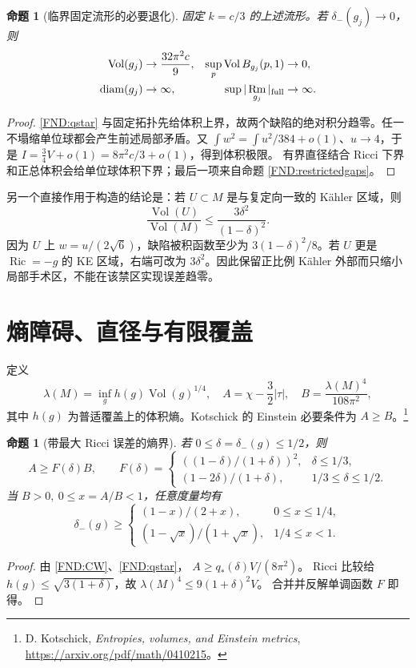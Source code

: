 \documentclass[UTF8,fontset=fandol,zihao=-4,oneside,openany]{ctexbook}
\theoremstyle{cjkplain}
\newtheorem{proposition}[theorem]{命题}
\numberwithin{equation}{chapter}
\DeclareMathOperator{\Ric}{Ric}
\DeclareMathOperator{\Rm}{Rm}
\DeclareMathOperator{\Vol}{Vol}
\begin{document}
\begin{proposition}[临界固定流形的必要退化]\label{FND:criticalcollapse}
固定 \(k=c/3\) 的上述流形。若 \(\delta_-(g_j)\to0\)，则
\[
\begin{aligned}
\Vol(g_j)&\to\frac{32\pi^2c}{9},&
\sup_p\Vol B_{g_j}(p,1)&\to0,\\
\operatorname{diam}(g_j)&\to\infty,&
\sup|\Rm_{g_j}|_{\rm full}&\to\infty .
\end{aligned}
\]
\end{proposition}
\begin{proof}
\eqref{FND:qstar} 与固定拓扑先给体积上界，故两个缺陷的绝对积分趋零。任一不塌缩单位球都会产生前述局部矛盾。又
\(\int w^2=\int u^2/384+o(1)\)、\(u\to4\)，于是
\(I=\frac34V+o(1)=8\pi^2c/3+o(1)\)，得到体积极限。
有界直径结合 Ricci 下界和正总体积会给单位球体积下界；最后一项来自命题 \ref{FND:restrictedgaps}。
\end{proof}

另一个直接作用于构造的结论是：若 \(U\subset M\) 是与复定向一致的 Kähler 区域，则
\begin{equation}\label{FND:kahlerfraction}
\frac{\Vol(U)}{\Vol(M)}
\le\frac{3\delta^2}{(1-\delta)^2}.
\end{equation}
因为 \(U\) 上 \(w=u/(2\sqrt6)\)，缺陷被积函数至少为
\(3(1-\delta)^2/8\)。若 \(U\) 更是 \(\Ric=-g\) 的 KE 区域，右端可改为 \(3\delta^2\)。因此保留正比例 Kähler 外部而只缩小局部手术区，不能在该禁区实现误差趋零。

\section{熵障碍、直径与有限覆盖}
定义
\[
\lambda(M)=\inf_g h(g)\Vol(g)^{1/4},\quad
A=\chi-\frac32|\tau|,\quad
B=\frac{\lambda(M)^4}{108\pi^2},
\]
其中 \(h(g)\) 为普适覆盖上的体积熵。Kotschick 的 Einstein 必要条件为 \(A\ge B\)。\footnote{D. Kotschick, \emph{Entropies, volumes, and Einstein metrics}, \url{https://arxiv.org/pdf/math/0410215}。}

\begin{proposition}[带最大 Ricci 误差的熵界]\label{FND:entropy}
若 \(0\le\delta=\delta_-(g)\le1/2\)，则
\[
A\ge F(\delta)B,\qquad
F(\delta)=
\begin{cases}
((1-\delta)/(1+\delta))^2,&\delta\le1/3,\\
(1-2\delta)/(1+\delta),&1/3\le\delta\le1/2.
\end{cases}
\]
当 \(B>0,\ 0\le x=A/B<1\)，任意度量均有
\[
\delta_-(g)\ge
\begin{cases}
(1-x)/(2+x),&0\le x\le1/4,\\
(1-\sqrt x)/(1+\sqrt x),&1/4\le x<1.
\end{cases}
\]
\end{proposition}
\begin{proof}
由 \eqref{FND:CW}、\eqref{FND:qstar}，
\(A\ge q_*(\delta)V/(8\pi^2)\)。
Ricci 比较给
\(h(g)\le\sqrt{3(1+\delta)}\)，故
\(\lambda(M)^4\le9(1+\delta)^2V\)。
合并并反解单调函数 \(F\) 即得。
\end{proof}
\end{document}
